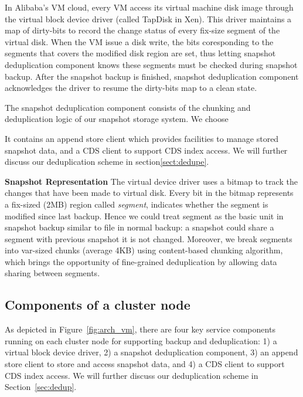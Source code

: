 {%
In Alibaba's VM cloud, every VM access its virtual machine disk image through the
virtual block device driver (called TapDisk\cite{Warfield2005} in Xen).
This driver maintains a map of dirty-bits to record
the change status of every fix-size segment of the virtual disk. 
When the VM issue a disk write, the bits coresponding to the segments that covers 
the modified disk region are set, thus letting snapshot deduplication component knows these
segments must be checked during snapshot backup. After the snapshot backup is finished, 
snapshot deduplication component acknowledges the driver to resume the dirty-bits map to
a clean state.

The snapshot deduplication component consists of the chunking and deduplication 
logic of our snapshot storage system. We choose 

It contains an append store client which provides facilities to manage stored snapshot data, and a CDS client to support CDS index access. We will further discuss our deduplication scheme in section\ref{sect:dedupe}.


{\bf Snapshot Representation}
The virtual device driver uses a bitmap to track the changes 
that have been made to virtual disk.
Every bit in the bitmap represents a fix-sized (2MB) region called \textit{segment}, indicates whether the segment
is modified since last backup. Hence we could treat segment as the basic unit 
in snapshot backup similar to
file in normal backup: a snapshot could share a segment with previous snapshot it is not changed. 
Moreover, we break segments into var-sized chunks (average 4KB) using content-based chunking algorithm,
which brings the opportunity of fine-grained deduplication by
allowing data sharing between segments.
}

\subsection{ Components of a cluster node } 

As  depicted in Figure~\ref{fig:arch_vm}, 
there are four key service components running on each cluster
node  for supporting backup and deduplication: 
1) a virtual block device driver, 2) a snapshot deduplication component,
3) an append store client to store  and access snapshot data,
and 4)  a CDS client to support CDS index access. We will further discuss our deduplication scheme 
in Section~\ref{sec:dedup}.


